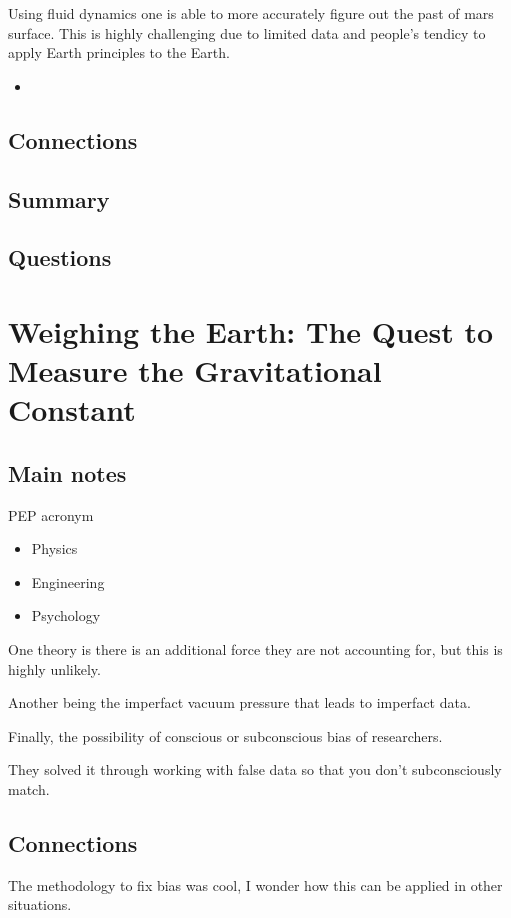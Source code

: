Using fluid dynamics one is able to more accurately figure out the past of mars surface. This is highly challenging due to limited data and people's tendicy to apply Earth principles to the Earth.

\begin{itemize}
	\item
\end{itemize}


\subsection{Connections}


\subsection{Summary}


\subsection{Questions}


\section{Weighing the Earth: The Quest to Measure the Gravitational Constant}
\subsection{Main notes}

PEP acronym
\begin{itemize}
	\item Physics
  \item Engineering
  \item Psychology
\end{itemize}
One theory is there is an additional force they are not accounting for, but this is highly unlikely.

Another being the imperfact vacuum pressure that leads to imperfact data.

Finally, the possibility of conscious or subconscious bias of researchers.

They solved it through working with false data so that you don't subconsciously match.

\subsection{Connections}

The methodology to fix bias was cool, I wonder how this can be applied in other situations.
